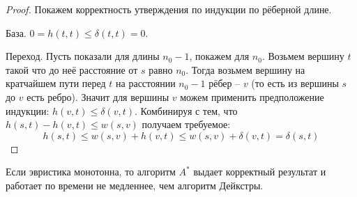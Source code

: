 \begin{proof}
    Покажем корректность утверждения по индукции по рёберной длине.

    База. $0 = h(t, t) \leq \delta(t, t) = 0$.

    Переход. Пусть показали для длины $n_0 - 1$, покажем для $n_0$. Возьмем вершину $t$ такой что до неё расстояние от $s$ равно $n_0$. Тогда возьмем вершину на кратчайшем пути перед $t$ на расстоянии $n_0 - 1$ рёбер -- $v$ (то есть из вершины $s$ до $v$ есть ребро). Значит для вершины $v$ можем применить предположение индукции: $h(v, t) \leq \delta(v, t)$. Комбинируя с тем, что $h(s, t) - h(v, t) \leq w(s, v)$ получаем требуемое:
    \begin{equation*}
        h(s, t) \leq w(s, v) + h(v, t) \leq w(s, v) + \delta(v, t) = \delta(s, t)
    \end{equation*}
\end{proof}

\ThBd Если эвристика монотонна, то алгоритм $A^*$ выдает корректный результат и работает по времени не медленнее, чем алгоритм Дейкстры.